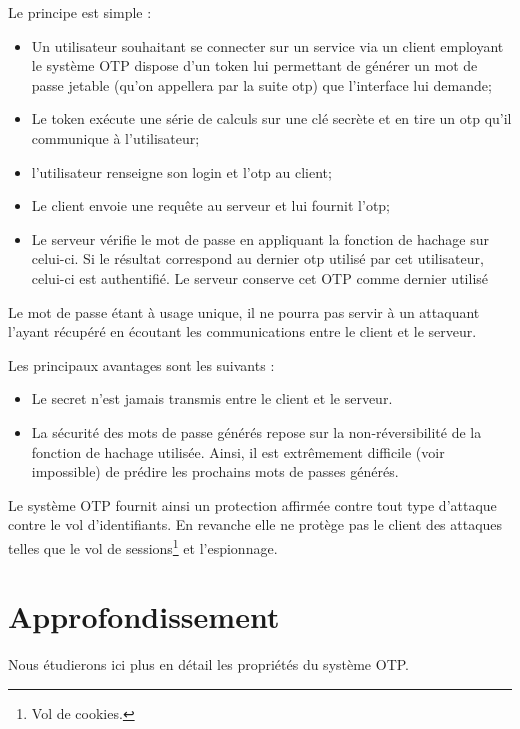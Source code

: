 \documentclass{../res/univ-projet}
\begin{document}
  Le principe est simple :

  \begin{itemize}
    \item Un utilisateur souhaitant se connecter sur un service via un client
    employant le système OTP dispose d'un token lui permettant de générer un 
    mot de passe jetable 
    (qu'on appellera par la suite otp) que l'interface lui demande;
    \item Le token exécute une série de calculs sur une clé secrète et en tire 
    un otp qu'il communique à l'utilisateur;
    \item l'utilisateur renseigne son login et l'otp au client;
    \item Le client envoie une requête au serveur et lui fournit l'otp; 
    \item Le serveur vérifie le mot de passe en appliquant la fonction de 
    hachage sur celui-ci. Si le résultat correspond au dernier otp utilisé par cet 
    utilisateur, celui-ci est authentifié. Le serveur conserve cet OTP comme dernier
    utilisé\\
  \end{itemize}

  Le mot de passe étant à usage unique, il ne pourra pas servir à un attaquant 
l'ayant récupéré en écoutant les communications entre le client et le serveur.

  Les principaux avantages sont les suivants :

  \begin{itemize}
    \item Le secret n'est jamais transmis entre le client et le serveur.
    \item La sécurité des mots de passe générés repose sur la non-réversibilité 
    de la fonction de hachage utilisée. Ainsi, il est extrêmement difficile (voir 
    impossible) de prédire les prochains mots de passes générés.\\
  \end{itemize}

  Le système OTP fournit ainsi un protection affirmée contre tout type 
  d'attaque contre le vol d'identifiants.
  En revanche elle ne protège pas le client des attaques telles 
  que le vol de sessions\footnote{Vol de cookies.} et l'espionnage.

\section{Approfondissement}
  Nous étudierons ici plus en détail les propriétés du système OTP.
\end{document}
